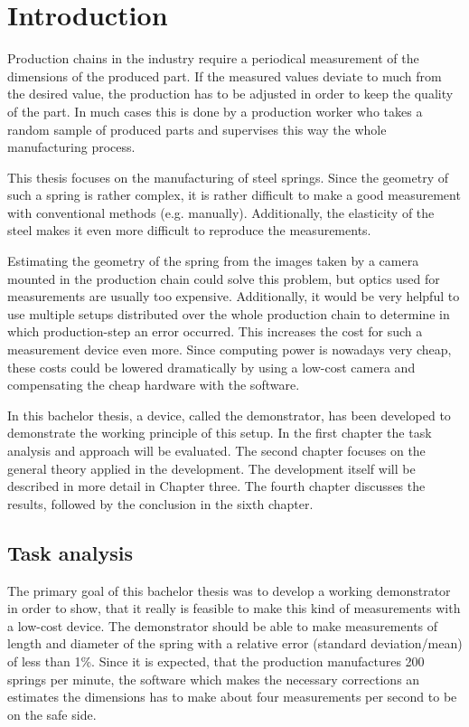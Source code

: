 \chapter{Introduction}
Production chains in the industry require a periodical measurement of the dimensions of the produced part.
If the measured values deviate to much from the desired value, the production has to be adjusted in order to keep the quality of the part.
In much cases this is done by a production worker who takes a random sample of produced parts and supervises this way the whole manufacturing process.

This thesis focuses on the manufacturing of steel springs.
Since the geometry of such a spring is rather complex, it is rather difficult to make a good measurement with conventional methods (e.g. manually).
Additionally, the elasticity of the steel makes it even more difficult to reproduce the measurements.

Estimating the geometry of the spring from the images taken by a camera mounted in the production chain could solve this problem, but optics used for measurements are usually too expensive.
Additionally, it would be very helpful to use multiple setups distributed over the whole production chain to determine in which production-step an error occurred.
This increases the cost for such a measurement device even more.
Since computing power is nowadays very cheap, these costs could be lowered dramatically by using a low-cost camera and compensating the cheap hardware with the software.

In this bachelor thesis, a device, called the demonstrator, has been developed to demonstrate the working principle of this setup.
In the first chapter the task analysis and approach will be evaluated.
The second chapter focuses on the general theory applied in the development.
The development itself will be described in more detail in Chapter three.
The fourth chapter discusses the results, followed by the conclusion in the sixth chapter. 

\newpage
\section{Task analysis}
The primary goal of this bachelor thesis was to develop a working demonstrator in order to show, that it really is feasible to make this kind of measurements with a low-cost device.
The demonstrator should be able to make measurements of length and diameter of the spring with a relative error (standard deviation/mean) of less than 1\%.
Since it is expected, that the production manufactures 200 springs per minute, the software which makes the necessary corrections an estimates the dimensions has to make about four measurements per second to be on the safe side.

